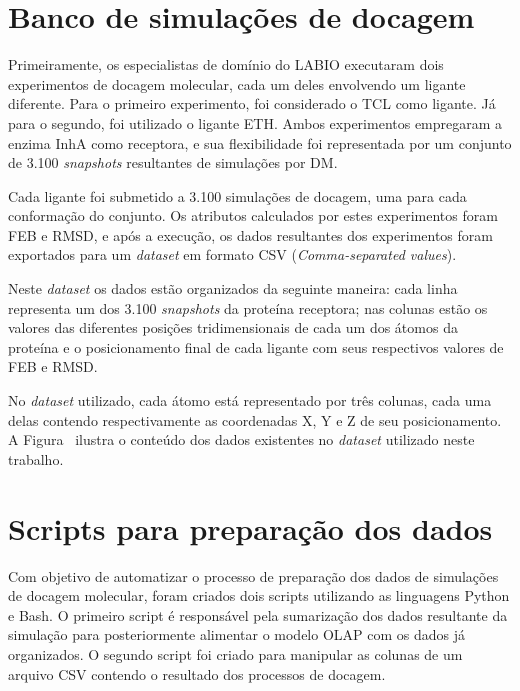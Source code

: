 \section{Banco de simulações de docagem}

Primeiramente, os especialistas de domínio do LABIO executaram dois experimentos de docagem molecular, cada um deles envolvendo um ligante diferente. Para o primeiro experimento, foi considerado o TCL como ligante. Já para o segundo, foi utilizado o ligante ETH. Ambos experimentos empregaram a enzima InhA como receptora, e sua flexibilidade foi representada por um conjunto de 3.100 \emph{snapshots} resultantes de simulações por DM. 

Cada ligante foi submetido a 3.100 simulações de docagem, uma para cada conformação do conjunto. Os atributos calculados por estes experimentos foram FEB e RMSD, e após a execução, os dados resultantes dos experimentos foram exportados para um \emph{dataset} em formato CSV (\emph{Comma-separated values}).

Neste \emph{dataset} os dados estão organizados da seguinte maneira: cada linha representa um dos 3.100 \emph{snapshots} da proteína receptora; nas colunas estão os valores das diferentes posições tridimensionais de cada um dos átomos da proteína e o posicionamento final de cada ligante com seus respectivos valores de FEB e RMSD.

No \emph{dataset} utilizado, cada átomo está representado por três colunas, cada uma delas contendo respectivamente as coordenadas X, Y e Z de seu posicionamento. A Figura \ ilustra o conteúdo dos dados existentes no \emph{dataset} utilizado neste trabalho.

%
%

\section{Scripts para preparação dos dados}

Com objetivo de automatizar o processo de preparação dos dados de simulações de docagem molecular, foram criados dois scripts utilizando as linguagens Python e Bash. O primeiro script é responsável pela sumarização dos dados resultante da simulação para posteriormente alimentar o modelo OLAP com os dados já organizados. O segundo script foi criado para manipular as colunas de um arquivo CSV contendo o resultado dos processos de docagem.

